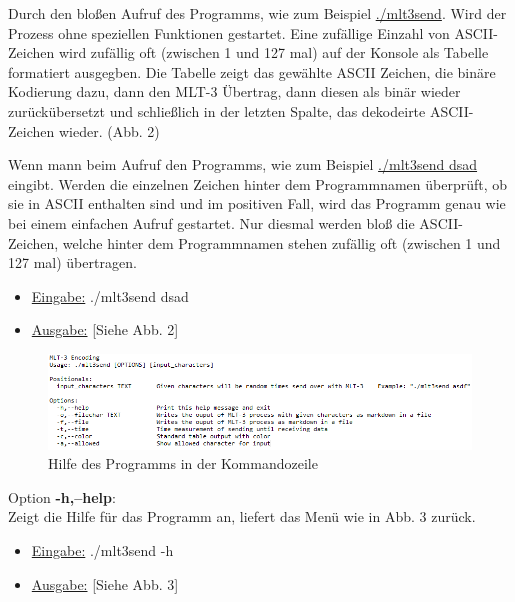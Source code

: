 \documentclass{article}
\begin{document}
Durch den bloßen Aufruf des Programms, wie zum Beispiel \underline{./mlt3send}. Wird der Prozess ohne speziellen Funktionen
gestartet. Eine zufällige Einzahl von ASCII-Zeichen wird zufällig oft (zwischen 1 und 127 mal) auf der Konsole als Tabelle formatiert ausgegben.
Die Tabelle zeigt das gewählte ASCII Zeichen, die binäre Kodierung dazu, dann den MLT-3 Übertrag, dann diesen als binär wieder zurückübersetzt
und schließlich in der letzten Spalte, das dekodeirte ASCII-Zeichen wieder. (Abb. 2)

Wenn mann beim Aufruf den Programms, wie zum Beispiel  \underline{./mlt3send dsad} eingibt. Werden die einzelnen Zeichen hinter dem Programmnamen
überprüft, ob sie in ASCII enthalten sind und im positiven Fall, wird das Programm genau wie bei einem einfachen Aufruf gestartet. Nur diesmal werden
bloß die ASCII-Zeichen, welche hinter dem Programmnamen stehen zufällig oft (zwischen 1 und 127 mal) übertragen. \\

\begin{itemize}
	\item \underline{Eingabe:} ./mlt3send dsad
	\item \underline{Ausgabe:} [Siehe Abb. 2]\\
\end{itemize}

\begin{center}
\begin{figure}[h]
    \centering
    \includegraphics[width=16cm]{climenu.png}
    \caption{Hilfe des Programms in der Kommandozeile}
\end{figure}
\end{center}

Option \textbf{-h,--help}:\\
Zeigt die Hilfe für das Programm an, liefert das Menü wie in Abb. 3 zurück.
\begin{itemize}
	\item \underline{Eingabe:} ./mlt3send -h
	\item \underline{Ausgabe:} [Siehe Abb. 3]\\
\end{itemize}
\end{document}
